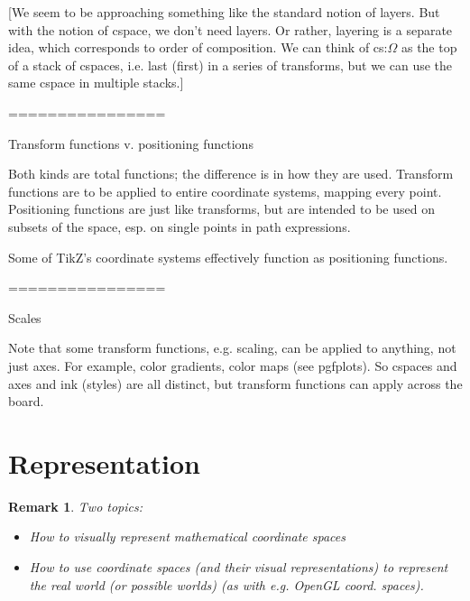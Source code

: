 \documentclass[reqno,12pt]{tufte-handout}
\numberwithin{equation}{subsection}
\numberwithin{equation}{subsection}
\newtheorem{remark}{Remark}
\newcommand\cspace{coordinate space}
\begin{document}
  [We seem to be approaching something like the standard notion of
    layers.  But with the notion of cspace, we don't need layers.  Or
    rather, layering is a separate idea, which corresponds to order of
    composition.  We can think of cs:$\Omega$ as the top of a stack of
    cspaces, i.e. last (first) in a series of transforms, but we can use
    the same cspace in multiple stacks.]

  ================

  Transform functions v. positioning functions

  Both kinds are total functions; the difference is in how they are
  used.  Transform functions are to be applied to entire coordinate
  systems, mapping every point.  Positioning functions are just like
  transforms, but are intended to be used on subsets of the space,
  esp. on single points in path expressions.

  Some of TikZ's coordinate systems effectively function as positioning functions.

  ================

  Scales

  Note that some transform functions, e.g. scaling, can be applied to
  anything, not just axes.  For example, color gradients, color maps
  (see pgfplots).  So cspaces and axes and ink (styles) are all
  distinct, but transform functions can apply across the board.





  \part{Representation}
  \label{sect:representation}

  \begin{remark}
    Two topics:
    \begin{itemize}
    \item How to visually represent mathematical \cspace{}s
    \item How to use \cspace{}s (and their visual representations) to
      represent the real world (or possible worlds) (as with e.g. OpenGL coord. spaces).
    \end{itemize}
  \end{remark}
\end{document}
